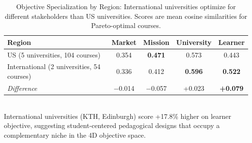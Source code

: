 \begin{table}[t]
\centering
\caption{Objective Specialization by Region: International universities optimize for different stakeholders than US universities. Scores are mean cosine similarities for Pareto-optimal courses.}
\label{tab:objective-specialization}
\begin{tabular}{lcccc}
\toprule
\textbf{Region} & \textbf{Market} & \textbf{Mission} & \textbf{University} & \textbf{Learner} \\
\midrule
US (5 universities, 104 courses) & 0.354 & \textbf{0.471} & 0.573 & 0.443 \\
International (2 universities, 54 courses) & 0.336 & 0.412 & \textbf{0.596} & \textbf{0.522} \\
\midrule
\textit{Difference} & $-$0.014 & $-$0.057 & +0.023 & \textbf{+0.079} \\
\bottomrule
\end{tabular}
\\[1mm]
{\footnotesize International universities (KTH, Edinburgh) score +17.8\% higher on learner objective, suggesting student-centered pedagogical designs that occupy a complementary niche in the 4D objective space.}
\end{table}
